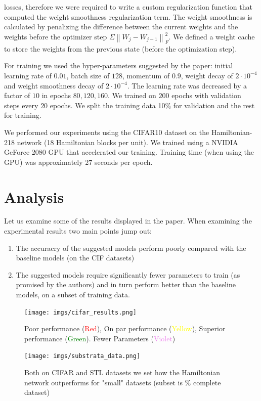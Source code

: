 \documentclass{article}
\theoremstyle{remark}
\newcommand{\norm}[1]{\left\lVert#1\right\rVert}
\begin{document}
losses, therefore we were required to write a custom regularization function that computed the weight smoothness regularization term. The weight smoothness is calculated by penalizing the 
difference between the current weights and the weights before the optimizer step $\Sigma \norm{W_j - W_{j-1}}^2_F$. We defined a weight cache to store the weights from the previous state 
(before the optimization step). \par
For training we used the hyper-parameters suggested by the paper: initial learning rate of $0.01$, batch size of $128$, momentum of $0.9$, weight decay of $2\cdot 10^{-4}$ and weight 
smoothness decay of $2\cdot 10^{-4}$. The learning rate was decreased by a factor of $10$ in epochs $80, 120, 160$. We trained on $200$ epochs with validation steps every $20$ epochs. 
We split the training data 10\% for validation and the rest for training.\par
We performed our experiments using the CIFAR10\cite{cifar10} dataset on the Hamiltonian-218 network (18 Hamiltonian blocks per unit). We trained using a NVIDIA GeForce 2080 GPU that 
accelerated our training. Training time (when using the GPU) was approximately 27 seconds per epoch.

\pagebreak

\section*{Analysis}
    Let us examine some of the results displayed in the paper. When examining the experimental results two main points jump out:
\begin{enumerate}
    \item The accuracry of the suggested models perform poorly compared with the baseline models (on the CIF datasets)
    \item The suggested models require significantly fewer parameters to train (as promised by the authors) and in turn perform better than the 
    baseline models, on a subset of training data.
\end{enumerate}

\begin{figure}[H]
    \centering
    \texttt{[image: imgs/cifar\_results.png]}
    \caption{Poor performance (\textcolor{red}{Red}), On par performance (\textcolor{yellow}{Yellow}), Superior performance (\textcolor{green}{Green}). Fewer Parameters (\textcolor{violet}{Violet})}
\end{figure}
\begin{figure}[H]
    \centering
    \texttt{[image: imgs/substrata\_data.png]}
    \caption{Both on CIFAR and STL datasets we set how the Hamiltonian network outperforms for "small" datasets (subset is \% complete dataset)}
\end{figure}
\end{document}
